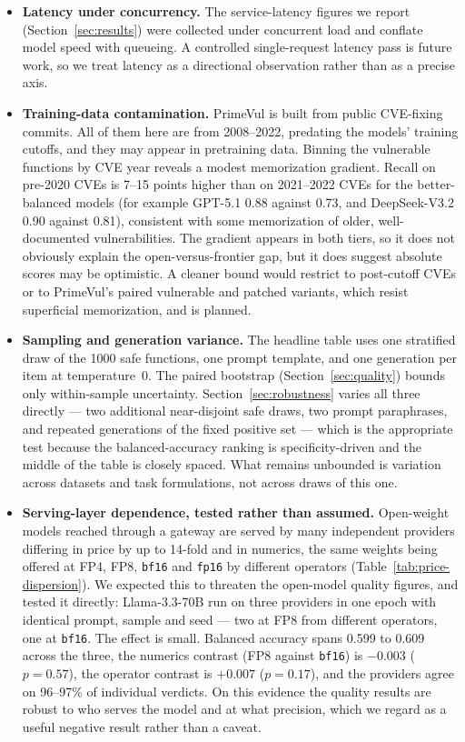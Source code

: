 \documentclass[computers,article,submit,moreauthors]{Definitions/mdpi}
\begin{document}
\begin{itemize}
\item \textbf{Latency under concurrency.} The service-latency figures we report (Section~\ref{sec:results}) were collected under concurrent load and conflate model speed with queueing. A controlled single-request latency pass is future work, so we treat latency as a directional observation rather than as a precise axis.
\item \textbf{Training-data contamination.} PrimeVul is built from public CVE-fixing commits. All of them here are from 2008--2022, predating the models' training cutoffs, and they may appear in pretraining data. Binning the vulnerable functions by CVE year reveals a modest memorization gradient. Recall on pre-2020 CVEs is 7--15 points higher than on 2021--2022 CVEs for the better-balanced models (for example GPT-5.1 0.88 against 0.73, and DeepSeek-V3.2 0.90 against 0.81), consistent with some memorization of older, well-documented vulnerabilities. The gradient appears in both tiers, so it does not obviously explain the open-versus-frontier gap, but it does suggest absolute scores may be optimistic. A cleaner bound would restrict to post-cutoff CVEs or to PrimeVul's paired vulnerable and patched variants, which resist superficial memorization, and is planned.
\item \textbf{Sampling and generation variance.} The headline table uses one stratified draw of the 1000 safe functions, one prompt template, and one generation per item at temperature~0. The paired bootstrap (Section~\ref{sec:quality}) bounds only within-sample uncertainty. Section~\ref{sec:robustness} varies all three directly --- two additional near-disjoint safe draws, two prompt paraphrases, and repeated generations of the fixed positive set --- which is the appropriate test because the balanced-accuracy ranking is specificity-driven and the middle of the table is closely spaced. What remains unbounded is variation across datasets and task formulations, not across draws of this one.

\item \textbf{Serving-layer dependence, tested rather than assumed.} Open-weight models reached through a gateway are served by many independent providers differing in price by up to 14-fold and in numerics, the same weights being offered at FP4, FP8, \texttt{bf16} and \texttt{fp16} by different operators (Table~\ref{tab:price-dispersion}). We expected this to threaten the open-model quality figures, and tested it directly: Llama-3.3-70B run on three providers in one epoch with identical prompt, sample and seed --- two at FP8 from different operators, one at \texttt{bf16}. The effect is small. Balanced accuracy spans 0.599 to 0.609 across the three, the numerics contrast (FP8 against \texttt{bf16}) is $-0.003$ ($p=0.57$), the operator contrast is $+0.007$ ($p=0.17$), and the providers agree on 96--97\% of individual verdicts. On this evidence the quality results are robust to who serves the model and at what precision, which we regard as a useful negative result rather than a caveat.


\end{itemize}
\end{document}

